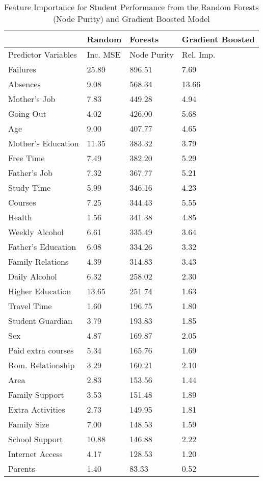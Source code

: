 \documentclass[sigconf]{acmart}
\begin{document}
\begin{table}
  \caption{Feature Importance for Student Performance from the Random Forests 
  (Node Purity) and Gradient Boosted Model}
  \label{tab:freq}
  \begin{tabular}{llll}
    \toprule
            & Random & Forests & Gradient Boosted \\    
    \midrule   
    
    Predictor Variables & Inc. MSE & Node Purity & Rel. Imp. \\    
    \midrule
    Failures            & 25.89 & 896.51 &  7.69 \\    
    Absences            &  9.08 & 568.34 & 13.66 \\
    Mother's Job        &  7.83 & 449.28 &  4.94 \\   
    Going Out           &  4.02 & 426.00 &  5.68 \\
    Age                 &  9.00 & 407.77 &  4.65 \\
    Mother's Education  & 11.35 & 383.32 &  3.79 \\
    Free Time           &  7.49 & 382.20 &  5.29 \\
    Father's Job        &  7.32 & 367.77 &  5.21 \\       
    Study Time          &  5.99 & 346.16 &  4.23 \\       
    Courses             &  7.25 & 344.43 &  5.55 \\ 
    Health              &  1.56 & 341.38 &  4.85 \\ 
    Weekly Alcohol      &  6.61 & 335.49 &  3.64 \\
    Father's Education  &  6.08 & 334.26 &  3.32 \\    
    Family Relations    &  4.39 & 314.83 &  3.43 \\    
    Daily Alcohol       &  6.32 & 258.02 &  2.30 \\
    Higher Education    & 13.65 & 251.74 &  1.63 \\   
    Travel Time         &  1.60 & 196.75 &  1.80 \\       
    Student Guardian    &  3.79 & 193.83 &  1.85 \\
    Sex                 &  4.87 & 169.87 &  2.05 \\
    Paid extra courses  &  5.34 & 165.76 &  1.69 \\
    Rom. Relationship   &  3.29 & 160.21 &  2.10 \\
    Area                &  2.83 & 153.56 &  1.44 \\
    Family Support      &  3.53 & 151.48 &  1.89 \\
    Extra Activities    &  2.73 & 149.95 &  1.81 \\
    Family Size         &  7.00 & 148.53 &  1.59 \\
    School Support      & 10.88 & 146.88 &  2.22 \\    
    Internet Access     &  4.17 & 128.53 &  1.20 \\
    Parents             &  1.40 &  83.33 &  0.52 \\
    \bottomrule
  \end{tabular}
\end{table}
\end{document}
